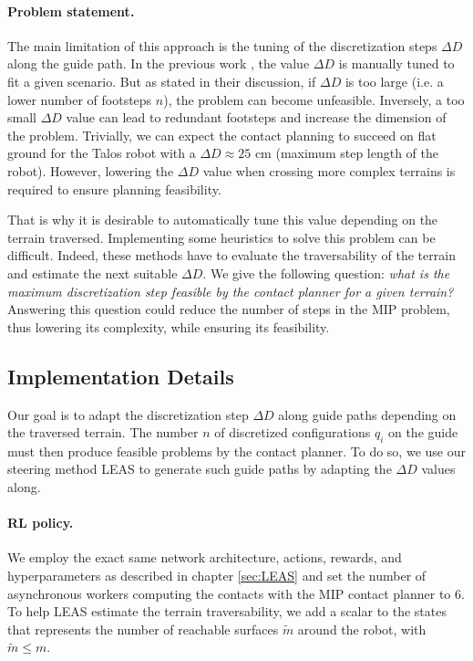 \paragraph{Problem statement.}
The main limitation of this approach is the tuning of the discretization steps $\Delta D$ along the guide path.
In the previous work \cite{sl1m_v2}, the value $\Delta D$ is manually tuned to fit a given scenario.
But as stated in their discussion, if $\Delta D$ is too large (i.e. a lower number of footsteps $n$), the problem can become unfeasible. Inversely, a too small $\Delta D$ value can lead to redundant footsteps and increase the dimension of the problem.
Trivially, we can expect the contact planning to succeed on flat ground for the Talos robot with a $\Delta D \approx 25$ cm (maximum step length of the robot). However, lowering the $\Delta D$ value when crossing more complex terrains is required to ensure planning feasibility.

That is why it is desirable to automatically tune this value depending on the terrain traversed.
Implementing some heuristics to solve this problem can be difficult. Indeed, these methods have to evaluate the traversability of the terrain and estimate the next suitable $\Delta D$.
We give the following question: \textit{what is the maximum discretization step feasible by the contact planner for a given terrain?}
Answering this question could reduce the number of steps in the MIP problem, thus lowering its complexity, while ensuring its feasibility.


\subsection{Implementation Details}
\label{subsub:mip:implementation_details}
Our goal is to adapt the discretization step $\Delta D$ along guide paths depending on the traversed terrain.
The number $n$ of discretized configurations $q_i$ on the guide must then produce feasible problems by the contact planner.
To do so, we use our steering method LEAS to generate such guide paths by adapting the $\Delta D$ values along.

\paragraph{RL policy.}
We employ the exact same network architecture, actions, rewards, and hyperparameters as described in chapter \ref{sec:LEAS} and set the number of asynchronous workers computing the contacts with the MIP contact planner to 6.
To help LEAS estimate the terrain traversability, we add a scalar to the states that represents the number of reachable surfaces $\tilde{m}$ around the robot, with $\tilde{m} \leq m$.

